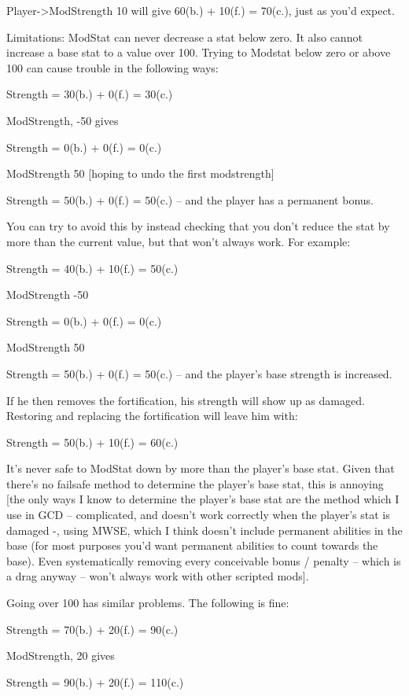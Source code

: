 Player-\textgreater ModStrength 10 will give 60(b.) + 10(f.) = 70(c.),
just as you'd expect.

Limitations: ModStat can never decrease a stat below zero. It also
cannot increase a base stat to a value over 100. Trying to Modstat below
zero or above 100 can cause trouble in the following ways:

Strength = 30(b.) + 0(f.) = 30(c.)

ModStrength, -50 gives

Strength = 0(b.) + 0(f.) = 0(c.)

ModStrength 50 {[}hoping to undo the first modstrength{]}

Strength = 50(b.) + 0(f.) = 50(c.) -- and the player has a permanent
bonus.

You can try to avoid this by instead checking that you don't reduce the
stat by more than the current value, but that won't always work. For
example:

Strength = 40(b.) + 10(f.) = 50(c.)

ModStrength -50

Strength = 0(b.) + 0(f.) = 0(c.)

ModStrength 50

Strength = 50(b.) + 0(f.) = 50(c.) -- and the player's base strength is
increased.

If he then removes the fortification, his strength will show up as
damaged. Restoring and replacing the fortification will leave him with:

Strength = 50(b.) + 10(f.) = 60(c.)

It's never safe to ModStat down by more than the player's base stat.
Given that there's no failsafe method to determine the player's base
stat, this is annoying {[}the only ways I know to determine the player's
base stat are the method which I use in GCD -- complicated, and doesn't
work correctly when the player's stat is damaged -, using MWSE, which I
think doesn't include permanent abilities in the base (for most purposes
you'd want permanent abilities to count towards the base). Even
systematically removing every conceivable bonus / penalty -- which is a
drag anyway -- won't always work with other scripted mods{]}.

Going over 100 has similar problems. The following is fine:

Strength = 70(b.) + 20(f.) = 90(c.)

ModStrength, 20 gives

Strength = 90(b.) + 20(f.) = 110(c.)

